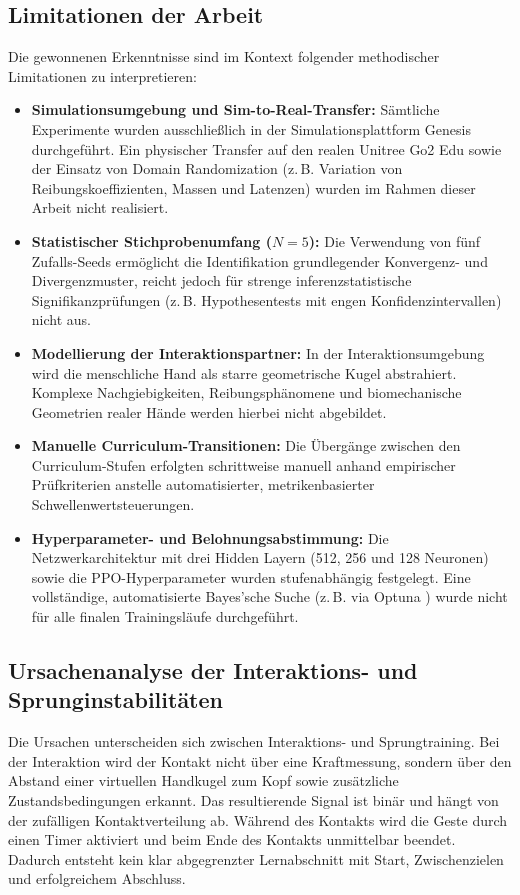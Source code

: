 \subsection{Limitationen der Arbeit}\label{sec:limitations}
Die gewonnenen Erkenntnisse sind im Kontext folgender methodischer Limitationen zu interpretieren:
\begin{itemize}
	\item \textbf{Simulationsumgebung und Sim-to-Real-Transfer:} Sämtliche Experimente wurden ausschließlich in der Simulationsplattform Genesis durchgeführt. Ein physischer Transfer auf den realen Unitree Go2 Edu sowie der Einsatz von Domain Randomization (z.\,B. Variation von Reibungskoeffizienten, Massen und Latenzen) wurden im Rahmen dieser Arbeit nicht realisiert.
	\item \textbf{Statistischer Stichprobenumfang ($N=5$):} Die Verwendung von fünf Zufalls-Seeds ermöglicht die Identifikation grundlegender Konvergenz- und Divergenzmuster, reicht jedoch für strenge inferenzstatistische Signifikanzprüfungen (z.\,B. Hypothesentests mit engen Konfidenzintervallen) nicht aus.
	\item \textbf{Modellierung der Interaktionspartner:} In der Interaktionsumgebung wird die menschliche Hand als starre geometrische Kugel abstrahiert. Komplexe Nachgiebigkeiten, Reibungsphänomene und biomechanische Geometrien realer Hände werden hierbei nicht abgebildet.
	\item \textbf{Manuelle Curriculum-Transitionen:} Die Übergänge zwischen den Curriculum-Stufen erfolgten schrittweise manuell anhand empirischer Prüfkriterien anstelle automatisierter, metrikenbasierter Schwellenwertsteuerungen.
	\item \textbf{Hyperparameter- und Belohnungsabstimmung:} Die Netzwerkarchitektur mit drei Hidden Layern (512, 256 und 128 Neuronen) sowie die PPO-Hyperparameter wurden stufenabhängig festgelegt. Eine vollständige, automatisierte Bayes'sche Suche (z.\,B. via Optuna \cite{akibaOptunaNextgenerationHyperparameter2019}) wurde nicht für alle finalen Trainingsläufe durchgeführt.
\end{itemize}

\subsection{Ursachenanalyse der Interaktions- und Sprunginstabilitäten}

Die Ursachen unterscheiden sich zwischen Interaktions- und Sprungtraining. Bei der Interaktion wird der Kontakt nicht über eine Kraftmessung, sondern über den Abstand einer virtuellen Handkugel zum Kopf sowie zusätzliche Zustandsbedingungen erkannt. Das resultierende Signal ist binär und hängt von der zufälligen Kontaktverteilung ab. Während des Kontakts wird die Geste durch einen Timer aktiviert und beim Ende des Kontakts unmittelbar beendet. Dadurch entsteht kein klar abgegrenzter Lernabschnitt mit Start, Zwischenzielen und erfolgreichem Abschluss.

